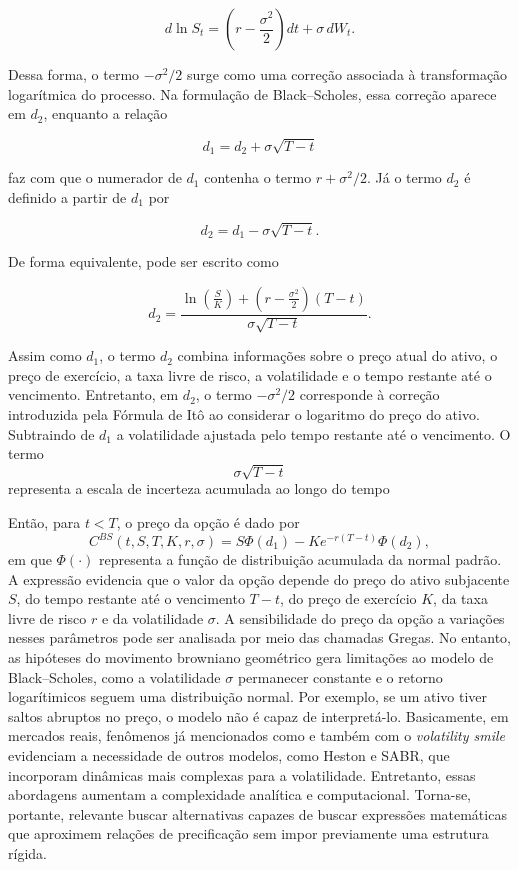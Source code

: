 \[
d\ln S_t
=
\left(r-\frac{\sigma^2}{2}\right)dt
+
\sigma\,dW_t.
\]

Dessa forma, o termo $-\sigma^2/2$ surge como uma correção associada à
transformação logarítmica do processo. Na formulação de Black--Scholes,
essa correção aparece em $d_2$, enquanto a relação

\[
d_1 = d_2 + \sigma\sqrt{T-t}
\]

faz com que o numerador de $d_1$ contenha o termo
$r+\sigma^2/2$. 
Já o termo $d_2$ é definido a partir de $d_1$ por

\begin{equation}
d_2 = d_1 - \sigma\sqrt{T-t}.
\end{equation}

De forma equivalente, pode ser escrito como

\begin{equation}
d_2 =
\frac{
\ln\left(\frac{S}{K}\right)
+
\left(r-\frac{\sigma^2}{2}\right)(T-t)
}{
\sigma\sqrt{T-t}
}.
\end{equation}

Assim como $d_1$, o termo $d_2$ combina informações sobre o preço atual
do ativo, o preço de exercício, a taxa livre de risco, a volatilidade e o
tempo restante até o vencimento. Entretanto, em $d_2$, o termo
$-\sigma^2/2$ corresponde à correção introduzida pela Fórmula de Itô ao
considerar o logaritmo do preço do ativo. Subtraindo de $d_1$ a volatilidade ajustada pelo tempo restante até o vencimento. O termo \[
\sigma\sqrt{T-t}
\] 
representa a escala de incerteza acumulada ao longo do tempo

Então, para $t<T$, o preço da opção é dado por
\begin{equation}
C^{BS}(t,S,T,K,r,\sigma)
=
S\Phi(d_1)
-
Ke^{-r(T-t)}\Phi(d_2),
\end{equation}
em que $\Phi(\cdot)$ representa a função de distribuição acumulada da
normal padrão.
A expressão evidencia que o valor da opção depende do preço do ativo
subjacente $S$, do tempo restante até o vencimento $T-t$, do preço de
exercício $K$, da taxa livre de risco $r$ e da volatilidade $\sigma$. \cite{saporito2024}
A sensibilidade do preço da opção a variações nesses parâmetros pode ser
analisada por meio das chamadas Gregas. No entanto, as hipóteses  do movimento browniano geométrico gera limitações ao modelo de Black--Scholes, como a volatilidade  $\sigma$ permanecer constante e o retorno logarítimicos seguem uma distribuição normal. Por exemplo, se um ativo tiver saltos abruptos no preço, o modelo não é capaz de interpretá-lo. Basicamente, em mercados
reais, fenômenos já mencionados como e também com o \textit{volatility smile} \cite{saporito2024} evidenciam a necessidade de
outros modelos, como Heston e SABR, que incorporam dinâmicas mais
complexas para a volatilidade. Entretanto, essas abordagens aumentam a
complexidade analítica e computacional. Torna-se, portante, relevante buscar alternativas capazes de buscar expressões matemáticas que aproximem relações de
precificação sem impor previamente uma estrutura rígida.

